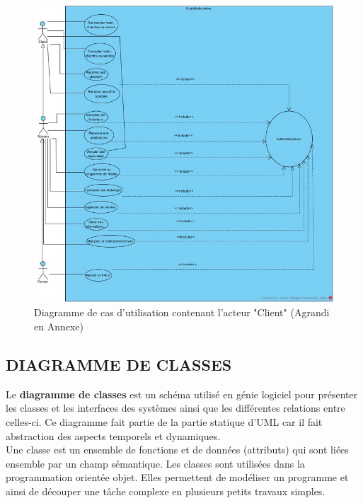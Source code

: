 \begin{figure}[!htbp]
	\begin{center}
		\includegraphics[scale=0.85]{images/diag_use_case1.jpg}
		\caption{Diagramme de cas d'utilisation contenant l'acteur "Client" (Agrandi en Annexe)}
		\label{use_case_diagramme_two}
	\end{center}
\end{figure}
\cleardoublepage
\subsection{DIAGRAMME DE CLASSES}

Le \textbf{diagramme de classes} est un schéma utilisé en génie logiciel pour présenter les classes et les interfaces des systèmes ainsi que les différentes relations entre celles-ci. Ce diagramme fait partie de la partie statique d'UML car il fait abstraction des aspects temporels et dynamiques.\\
Une classe est un ensemble de fonctions et de données (attributs) qui sont liées ensemble par un champ sémantique. Les classes sont utilisées dans la programmation orientée objet. Elles permettent de modéliser un programme et ainsi de découper une tâche complexe en plusieurs petits travaux simples.\\

